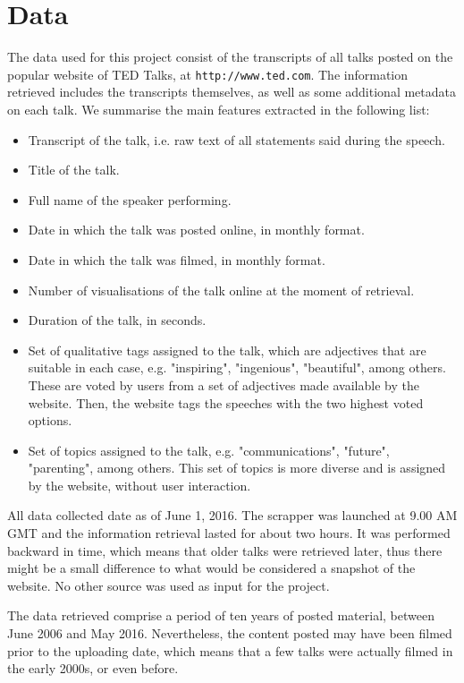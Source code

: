 \documentclass[a4paper, 11pt]{article} %
\begin{document}
\section*{Data}

The data used for this project consist of the transcripts of all talks posted on the  popular website of TED Talks, at \texttt{http://www.ted.com}. The information retrieved includes the transcripts themselves, as well as some additional metadata on each talk. We summarise the main features extracted in the following list:

\begin{itemize}
\item Transcript of the talk, i.e. raw text of all statements said during the speech.
\item Title of the talk.
\item Full name of the speaker performing.
\item Date in which the talk was posted online, in monthly format.
\item Date in which the talk was filmed, in monthly format.
\item Number of visualisations of the talk online at the moment of retrieval.
\item Duration of the talk, in seconds.
\item Set of qualitative tags assigned to the talk, which are adjectives that are suitable in each case, e.g. "inspiring", "ingenious", "beautiful", among others. These are voted by users from a set of adjectives made available by the website. Then, the website tags the speeches with the two highest voted options.
\item Set of topics assigned to the talk, e.g. "communications", "future", "parenting", among others. This set of topics is more diverse and is assigned by the website, without user interaction.
\end{itemize}

All data collected date as of June 1, 2016. The scrapper was launched at 9.00 AM GMT and the information retrieval lasted for about two hours. It was performed backward in time, which means that older talks were retrieved later, thus there might be a small difference to what would be considered a snapshot of the website. No other source was used as input for the project.

The data retrieved comprise a period of ten years of posted material, between June 2006 and May 2016. Nevertheless, the content posted may have been filmed prior to the uploading date, which means that a few talks were actually filmed in the early 2000s, or even before.
\end{document}
